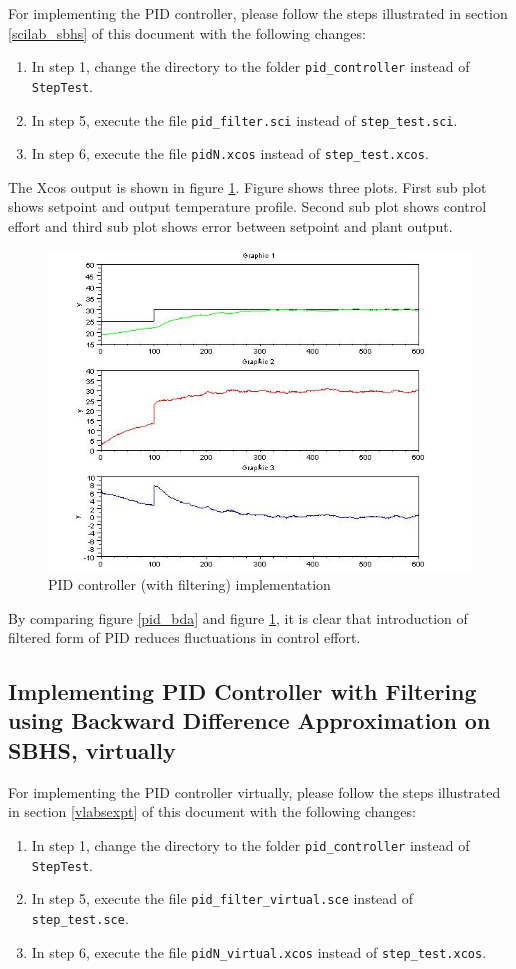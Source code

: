For implementing the PID controller, please follow the steps illustrated in section \ref{scilab_sbhs} of this document with 
the following changes:
\begin{enumerate}

\item In step 1, change the directory to the folder {\tt pid\_controller} instead of {\tt StepTest}.
\item In step 5, execute the file {\tt pid\_filter.sci} instead of {\tt step\_test.sci}.
\item In step 6, execute the file {\tt pidN.xcos} instead of {\tt step\_test.xcos}.

\end{enumerate}

The Xcos output is shown in figure \ref{pid_filter}.
Figure shows three plots. First sub plot shows setpoint and output temperature profile. Second sub plot shows control
effort and third sub plot shows error between setpoint and plant output.

\begin{figure}
\centering
\includegraphics[width=0.7\linewidth]{pid_manual/pid_filter.jpg}
\caption{PID controller (with filtering) implementation}
\label{pid_filter}
\end{figure}

By comparing figure \ref{pid_bda} and figure \ref{pid_filter}, it is clear that introduction of filtered form of 
PID reduces fluctuations in control effort.

\subsection{Implementing PID Controller with Filtering using Backward Difference Approximation on SBHS, virtually}
For implementing the PID controller virtually, please follow the steps illustrated in section \ref{vlabsexpt} of this 
document with the following changes:
\begin{enumerate}

\item In step 1, change the directory to the folder {\tt pid\_controller} instead of {\tt StepTest}.
\item In step 5, execute the file {\tt pid\_filter\_virtual.sce} instead of {\tt step\_test.sce}.
\item In step 6, execute the file {\tt pidN\_virtual.xcos} instead of {\tt step\_test.xcos}.

\end{enumerate}


